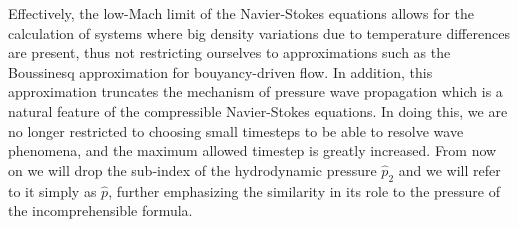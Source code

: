 Effectively, the low-Mach limit of the Navier-Stokes equations allows for the calculation of systems where big density variations due to temperature differences are present, thus not restricting ourselves to approximations such as the Boussinesq approximation for bouyancy-driven flow. In addition, this approximation truncates the mechanism of pressure wave propagation which is a natural feature of the compressible Navier-Stokes equations. In doing this, we are no longer restricted to choosing small timesteps to be able to resolve wave phenomena, and the maximum allowed timestep is greatly increased.  
From now on we will drop the sub-index of the hydrodynamic pressure $\hat p_2$ and we will refer to it simply as $\hat p$, further emphasizing the similarity in its role to the pressure of the incomprehensible formula.

